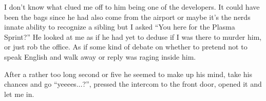 I don't know what clued me off to him being one of the developers. It could have been the bags since he had also come from the airport or maybe it's the nerds innate ability to recognize a sibling but I asked “You here for the Plasma Sprint?” 
He looked at me as if he had yet to deduse if I was there to murder him, or just rob the office. As if some kind of debate on whether to pretend not to speak English and walk away or reply was raging inside him. 

After a rather too long second or five he seemed to make up his mind, take his chances and go “yeeees...?”, pressed the intercom to the front door, opened it and let me in.

